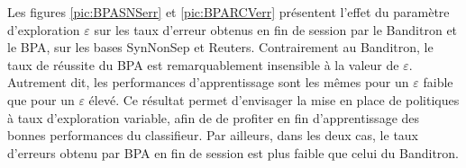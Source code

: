 \documentclass[preprint,12pt,authoryear]{elsarticle}
\begin{document}
Les figures \ref{pic:BPASNSerr} et  \ref{pic:BPARCVerr}  présentent l'effet du paramètre d'exploration $\varepsilon$ sur les taux d'erreur obtenus en fin de session par le Banditron et le BPA, sur les bases SynNonSep et Reuters. Contrairement au Banditron, le taux de réussite du BPA est remarquablement insensible à la valeur de $\varepsilon$. Autrement dit, les performances d'apprentissage sont les mêmes pour un $\varepsilon$ faible que pour un $\varepsilon$ élevé. Ce résultat permet d'envisager la mise en place de politiques à taux d'exploration variable, afin de de profiter en fin d'apprentissage des bonnes performances du classifieur.
Par ailleurs, dans les deux cas, le taux d'erreurs obtenu par BPA en fin de session est plus faible que celui du Banditron. 




\end{document}
